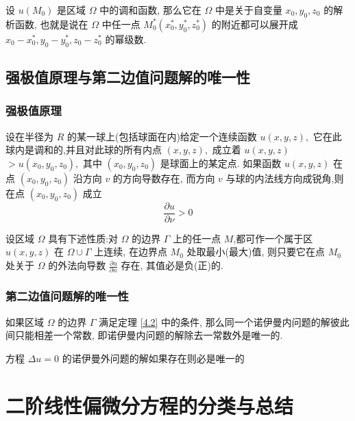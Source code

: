 \documentclass[10pt]{yerbaformat}
\begin{document}
\begin{theorem}[调和函数的解析性定理]
    设 $u\left(M_{0}\right)$ 是区域 $\Omega$ 中的调和函数, 那么它在 $\Omega$ 中是关于自变量 $x_{0}, y_{0}, z_{0}$ 的解析函数, 也就是说在 $\Omega$ 中任一点 $M_{0}^{*}\left(x_{0}^{*}, y_{0}^{*}, z_{0}^{*}\right)$ 的附近都可以展开成 $x_{0}-x_{0}^{*}, y_{0}-y_{0}^{*}, z_{0}-z_{0}^{*}$ 的幂级数.
\end{theorem}

\subsection{强极值原理与第二边值问题解的唯一性}
\subsubsection{强极值原理}

\begin{theorem}[强极值原理]
    设在半径为 $R$ 的某一球上(包括球面在内)给定一个连续函数 $u(x, y, z),$ 它在此球内是调和的,并且对此球的所有内点 $(x, y, z),$ 成立着 $u(x, y, z)$ $>u\left(x_{0}, y_{0}, z_{0}\right),$ 其中 $\left(x_{0}, y_{0}, z_{0}\right)$ 是球面上的某定点. 如果函数 $u(x, y, z)$ 在点 $(x_{0}, y_{0}, z_{0})$ 沿方向 $v$ 的方向导数存在, 而方向 $v$ 与球的内法线方向成锐角,则在点 $\left(x_{0}, y_{0}, z_{0}\right)$ 成立
    $$
    \frac{\partial u}{\partial \nu}>0
    $$
\end{theorem}

\begin{theorem}\label{4.2}
    设区域 $\Omega$ 具有下述性质:对 $\Omega$ 的边界 $\Gamma$ 上的任一点 $M$,都可作一个属于区 $u(x, y, z)$ 在 $\Omega \cup \Gamma$ 上连续, 在边界点 $M_{0}$ 处取最小(最大)值, 则只要它在点 $M_{0}$ 处关于 $\Omega$ 的外法向导数 $\frac{\partial u}{\partial n}$ 存在, 其值必是负(正)的.
\end{theorem}

\subsubsection{第二边值问题解的唯一性}

\begin{theorem}
    如果区域 $\Omega$ 的边界 $\Gamma$ 满足定理 \ref{4.2} 中的条件, 那么同一个诺伊曼内问题的解彼此间只能相差一个常数, 即诺伊曼内问题的解除去一常数外是唯一的.
\end{theorem}

\begin{theorem}
    方程 $\Delta u =0$ 的诺伊曼外问题的解如果存在则必是唯一的
\end{theorem}

\section{二阶线性偏微分方程的分类与总结}
\end{document}
